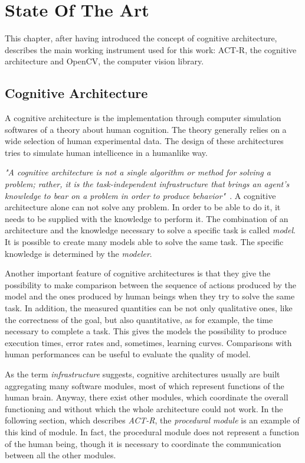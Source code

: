 \chapter{State Of The Art}
  This chapter, after having introduced the concept of cognitive architecture, describes the main working instrument used for this work: \mbox{ACT-R,} the cognitive architecture and \mbox{OpenCV,} the computer vision library. 
  \section{Cognitive Architecture}	
	A cognitive architecture is the implementation through computer simulation softwares of a theory about human cognition. The theory generally relies on a wide selection of human experimental data. The design of these architectures tries to simulate human intellicence in a humanlike way.
	
	\textit{"A cognitive architecture is not a single algorithm or method for solving a problem; rather, it is the task-independent infrastructure that brings an agent’s knowledge to bear on a problem in order to produce behavior"}~\cite{SoarCogArch2012}. A cognitive architecture alone can not solve any problem. In order to be able to do it, it needs to be supplied with the knowledge to perform it. The combination of an architecture and the knowledge necessary to solve a specific task is called \emph{model}. It is possible to create many models able to solve the same task. The specific knowledge is determined by the \emph{modeler}. ~\cite{Sears2012}
	
	Another important feature of cognitive architectures is that they give the possibility to make comparison between the sequence of actions produced by the model and the ones produced by human beings when they try to solve the same task. In addition, the measured quantities can be not only qualitative ones, like the correctness of the goal, but also quantitative, as for example, the time necessary to complete a task. This gives the models the possibility to produce execution times, error rates and, sometimes, learning curves. Comparisons with human performances can be useful to evaluate the quality of model.
	
	As the term \emph{infrastructure} suggests, cognitive architectures usually are built aggregating many software modules, most of which represent functions of the human brain. Anyway, there exist other modules, which coordinate the overall functioning and without which the whole architecture could not work. In the following section, which describes \emph{ACT-R}, the \emph{procedural module} is an example of this kind of module. In fact, the procedural module does not represent a function of the human being, though it is necessary to coordinate the communication between all the other modules.
	
